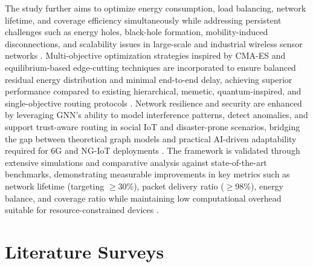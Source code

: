 \documentclass[a4paper,fleqn]{cas-dc}
\numberwithin{equation}{section}
\begin{document}
The study further aims to optimize energy consumption, load balancing, network lifetime, and coverage efficiency simultaneously while addressing persistent challenges such as energy holes, black-hole formation, mobility-induced disconnections, and scalability issues in large-scale and industrial wireless sensor networks \cite{r8,r9}. Multi-objective optimization strategies inspired by CMA-ES and equilibrium-based edge-cutting techniques are incorporated to ensure balanced residual energy distribution and minimal end-to-end delay, achieving superior performance compared to existing hierarchical, memetic, quantum-inspired, and single-objective routing protocols \cite{r9,sensors2018,r11,r12}. Network resilience and security are enhanced by leveraging GNN's ability to model interference patterns, detect anomalies, and support trust-aware routing in social IoT and disaster-prone scenarios, bridging the gap between theoretical graph models and practical AI-driven adaptability required for 6G and NG-IoT deployments \cite{r16,r22,r26}. The framework is validated through extensive simulations and comparative analysis against state-of-the-art benchmarks, demonstrating measurable improvements in key metrics such as network lifetime (targeting $\geq$30\%), packet delivery ratio ($\geq$98\%), energy balance, and coverage ratio while maintaining low computational overhead suitable for resource-constrained devices \cite{r2,r9,r12}.

\section{Literature Surveys}
\end{document}
